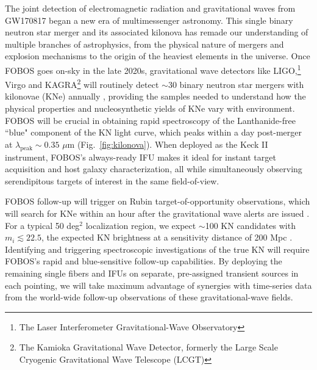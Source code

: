 \documentclass[11pt,a4paper,twoside,onecolumn,openany,final,oldfontcommands]{memoir}
\begin{document}
The joint detection of electromagnetic radiation and gravitational waves from GW170817 began a new era of multimessenger astronomy.  This single binary neutron star merger and its associated kilonova has remade our understanding of multiple branches of astrophysics, from the physical nature of mergers and explosion mechanisms to the origin of the heaviest elements in the universe.  Once FOBOS goes on-sky in the late 2020s, gravitational wave detectors like LIGO,\footnote{The Laser Interferometer Gravitational-Wave Observatory} Virgo and KAGRA\footnote{The Kamioka Gravitational Wave Detector, formerly the Large Scale Cryogenic Gravitational Wave Telescope (LCGT)} will routinely detect $\sim$30 binary neutron star mergers with kilonovae (KNe) annually \citep{abbott2018prospects}, providing the samples needed to understand how the physical properties and nucleosynthetic yields of KNe vary with environment.  FOBOS will be crucial in obtaining rapid spectroscopy of the Lanthanide-free ``blue" component of the KN light curve, which peaks within a day post-merger at $\lambda_\mathrm{peak}\sim0.35$ $\mu$m (Fig.~\ref{fig:kilonova}). When deployed as the Keck II instrument, FOBOS's always-ready IFU makes it ideal for instant target acquisition and host galaxy characterization, all while simultaneously observing serendipitous targets of interest in the same field-of-view. 


FOBOS follow-up will trigger on Rubin target-of-opportunity observations, which will search for KNe within an hour after the gravitational wave alerts are issued \citep[assuming the strategy proposed by][]{margutti2018}. For a typical 50 deg$^2$ localization region, we expect $\sim$100 KN candidates with $m_i\lesssim22.5$, the expected KN brightness at a sensitivity distance of 200 Mpc \citep{cowperthwaite2017, goldstein2019}. Identifying and triggering spectroscopic investigations of the true KN will require FOBOS's rapid and blue-sensitive follow-up capabilities.  By deploying the remaining single fibers and IFUs on separate, pre-assigned transient sources in each pointing, we will take maximum advantage of synergies with time-series data from the world-wide follow-up observations of these gravitational-wave fields. 
\end{document}
